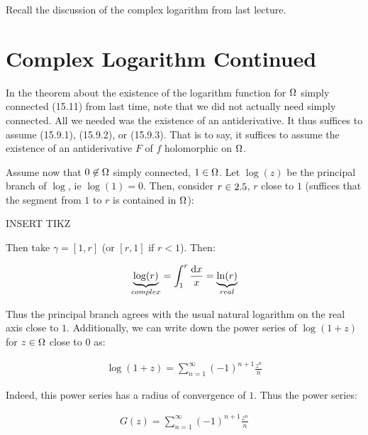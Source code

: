 \setcounter{section}{0}
\setcounter{theorem}{0}


Recall the discussion of the complex logarithm from last lecture.

\section{Complex Logarithm Continued}

\begin{remark}
In the theorem about the existence of the logarithm function for $\Omega $ simply connected (15.11) from last time, note that we did not actually need simply connected. All we needed was the existence of an antiderivative. It thus suffices to assume (15.9.1), (15.9.2), or (15.9.3). That is to say, it suffices to assume the existence of an antiderivative $F$ of $f$ holomorphic on $\Omega$.

\end{remark}

Assume now that $0 \not\in \Omega$ simply connected, $1 \in \Omega$. Let $\log(z)$ be the principal branch of $\log$, ie $\log(1) = 0$. Then, consider $r \in 2.5$, $r$ close to $1$ (suffices that the segment from $1$ to $r$ is contained in $\Omega$):

INSERT TIKZ

Then take $\gamma = [1,r]$ (or $[r,1]$ if $r< 1$). Then:

\begin{align*}
    \underbrace{\log(r)}_{complex} = \int_1^r \frac{\dif x}{x} = \underbrace{\ln(r)}_{real}
\end{align*}

Thus the principal branch agrees with the usual natural logarithm on the real axis close to $1$. Additionally, we can write down the power series of $\log(1+z)$ for $z \in \Omega$ close to $0$ as:

\begin{align*}
    \log(1+z) = \sum_{n=1}^\infty (-1)^{n+1} \frac{z^n}{n}
\end{align*}

Indeed, this power series has a radius of convergence of $1$. Thus the power series:

\begin{align*}
    G(z) = \sum_{n=1}^\infty (-1)^{n+1} \frac{z^n}{n}
\end{align*}

